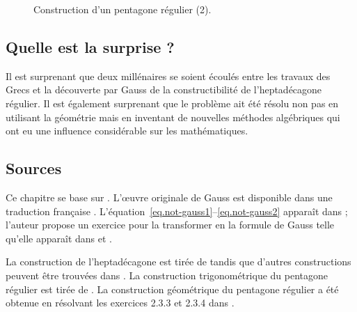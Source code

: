 \begin{figure}[htbp]
\centering

\caption{Construction d'un pentagone régulier 
 (2).}\label{f.hept-pentagon3}
\end{figure}

\subsection*{Quelle est la surprise ?}

Il est surprenant que deux millénaires se soient écoulés entre les travaux des Grecs  et la découverte par Gauss de la constructibilité de l'heptadécagone régulier. Il est également surprenant que le problème ait été résolu non pas en utilisant la géométrie mais en inventant de nouvelles méthodes algébriques qui ont eu une influence considérable sur les mathématiques.


\subsection*{Sources}

Ce chapitre se base sur \cite{jorg}. L'œuvre originale de Gauss est disponible dans une traduction française \cite{gauss}.
L'équation~\ref{eq.not-gauss1}--\ref{eq.not-gauss2} apparaît dans \cite{rike} ; l'auteur propose un exercice pour la transformer en la formule de Gauss telle qu'elle apparaît dans \cite[p.~458]{gauss} et \cite[p.~68]{jorg}.

La construction de l'heptadécagone est tirée de \cite{callagy} tandis que d'autres constructions peuvent être trouvées dans \cite{wiki:heptadecagon}. La construction trigonométrique du pentagone régulier est tirée de \cite{wiki:pentagon}. La construction géométrique du pentagone régulier a été obtenue en résolvant les exercices 2.3.3 et 2.3.4 dans \cite{stillwell}.
